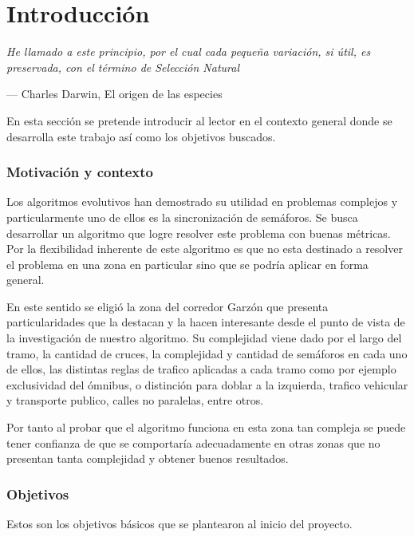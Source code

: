 \chapter{Introducción}
\epigraph{ \textit{He llamado a este principio, por el cual cada pequeña variación, si útil, es preservada, con el término de Selección Natural}}{--- Charles Darwin, El origen de las especies}

En esta sección se pretende introducir al lector en el contexto general donde se desarrolla este trabajo así como los objetivos buscados.

\subsection{Motivación y contexto}

Los algoritmos evolutivos han demostrado su utilidad en problemas complejos y particularmente uno de ellos es la sincronización de semáforos. Se busca desarrollar un algoritmo que logre resolver este problema con buenas métricas.
Por la flexibilidad inherente de este algoritmo es que no esta destinado a resolver el problema en una zona en particular sino que se podría aplicar en forma general.

En este sentido se eligió la zona del corredor Garzón que presenta particularidades que la destacan y la hacen interesante desde el punto de vista de la investigación de nuestro algoritmo. Su complejidad viene dado por el largo del tramo, la cantidad de cruces, la complejidad y cantidad de semáforos en cada uno de ellos, las distintas reglas de trafico aplicadas a cada tramo como por ejemplo exclusividad del ómnibus, o distinción para doblar a la izquierda, trafico vehicular y transporte publico, calles no paralelas, entre otros.

Por tanto al probar que el algoritmo funciona en esta zona tan compleja se puede tener confianza de que se comportaría adecuadamente en otras zonas que no presentan tanta complejidad y obtener buenos resultados.



\newpage

\subsection{Objetivos}

Estos son los objetivos básicos que se plantearon al inicio del  proyecto.

